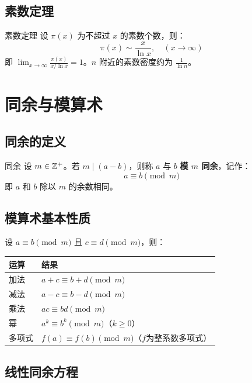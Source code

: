 \subsection{素数定理}

\begin{myTheorem}{素数定理}
设 \(\pi(x)\) 为不超过 \(x\) 的素数个数，则：
\[
\pi(x) \sim \frac{x}{\ln x},\quad (x\to\infty)
\]
即 \(\lim_{x\to\infty} \frac{\pi(x)}{x/\ln x}=1\)。\(n\) 附近的素数密度约为 \(\frac{1}{\ln n}\)。
\end{myTheorem}

\section{同余与模算术}

\subsection{同余的定义}

\begin{mydefinition}{同余}
设 \(m\in\mathbb{Z}^+\)。若 \(m\mid(a-b)\)，则称 \(a\) 与 \(b\) \textbf{模 \(m\) 同余}，记作：
\[
a \equiv b \pmod{m}
\]
即 \(a\) 和 \(b\) 除以 \(m\) 的余数相同。
\end{mydefinition}

\subsection{模算术基本性质}

设 \(a\equiv b\pmod{m}\) 且 \(c\equiv d\pmod{m}\)，则：

\begin{table}[H]
\centering
\begin{tabular}{ll}
\toprule
运算 & 结果 \\
\midrule
加法 & \(a+c \equiv b+d \pmod{m}\) \\
减法 & \(a-c \equiv b-d \pmod{m}\) \\
乘法 & \(ac \equiv bd \pmod{m}\) \\
幂 & \(a^k \equiv b^k \pmod{m}\)（\(k\geqslant 0\)） \\
多项式 & \(f(a)\equiv f(b)\pmod{m}\)（\(f\)为整系数多项式） \\
\bottomrule
\end{tabular}
\end{table}

\subsection{线性同余方程}

